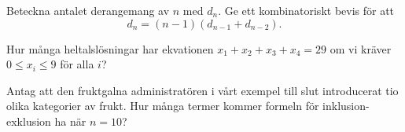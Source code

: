 \documentclass[nobib]{tufte-handout}
\begin{document}
\begin{xca}
  Beteckna antalet derangemang av $n$ med $d_n$. Ge ett kombinatoriskt bevis för att
  $$d_n = (n-1)(d_{n-1} + d_{n-2}).$$
\end{xca}

\begin{xca}
  Hur många heltalslösningar har ekvationen $x_1 + x_2 + x_3 + x_4 = 29$ om vi kräver $0 \leq x_i \leq 9$ för alla $i$?
\end{xca}

\begin{xca}
  Antag att den fruktgalna administratören i vårt exempel till slut introducerat tio olika kategorier av frukt. Hur många termer kommer formeln för inklusion-exklusion ha när $n = 10$?
\end{xca}

%
%
\end{document}
